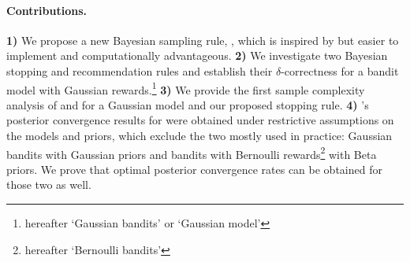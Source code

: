 % 


\paragraph{Contributions.} %
\textbf{1)}
We propose a new Bayesian sampling rule, \TCC, which is inspired by \TTTS but easier to implement and computationally advantageous. 
\textbf{2)} We investigate two Bayesian stopping and recommendation rules and establish their $\delta$-correctness for a bandit model with Gaussian rewards.\footnote{hereafter `Gaussian bandits' or `Gaussian model'}
\textbf{3)}
We provide the first sample complexity analysis of \TTTS and \TCC for a Gaussian model and our proposed stopping rule.
\textbf{4)} \citeauthor{russo2016ttts}'s posterior convergence results for \TTTS were obtained under restrictive assumptions on the models and priors, which exclude the two mostly used in practice: Gaussian bandits with Gaussian priors and bandits with Bernoulli rewards\footnote{hereafter `Bernoulli bandits'} with Beta priors. We prove that optimal posterior convergence rates can be obtained for those two as well.

